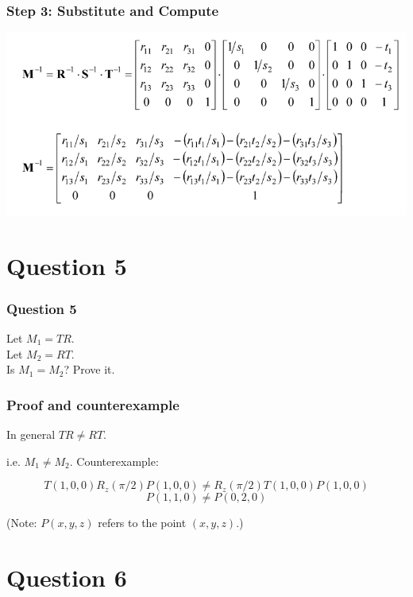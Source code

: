 \documentclass{beamer}
\begin{document}
\begin{frame}
    \frametitle{Step 3: Substitute and Compute}

    \begin{center}
        \includegraphics[scale=0.6]{q4.png}
    \end{center}

\end{frame}

\section{Question 5}

\begin{frame}
    \frametitle{Question 5}
    
    Let $M_1 = TR$. \\
    Let $M_2 = RT$. \\
    Is $M_1 = M_2$? Prove it.

\end{frame}

\begin{frame}
    \frametitle{Proof and counterexample}

    \begin{tcolorbox}
        In general $TR \neq RT$.
    \end{tcolorbox}

    i.e. $M_1 \neq M_2$. Counterexample:

    $$T(1, 0, 0) R_z(\pi/2) P(1, 0, 0) \neq R_z(\pi/2) T(1, 0, 0) P(1, 0, 0)$$
    $$P(1, 1, 0) \neq P(0, 2, 0)$$

    (Note: $P(x,y,z)$ refers to the point $(x,y,z)$.)

\end{frame}

\section{Question 6}
\end{document}
